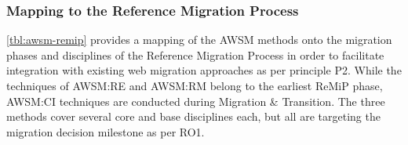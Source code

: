 \hypertarget{sec:remip-mapping}{%
\subsubsection{Mapping to the Reference Migration Process}\label{sec:remip-mapping}}

\cref{tbl:awsm-remip} provides a mapping of the AWSM methods onto the migration phases and disciplines of the Reference Migration Process \autocite{Sneed2010ReMiP} in order to facilitate integration with existing web migration approaches as per principle P2.
While the techniques of AWSM:RE and AWSM:RM belong to the earliest ReMiP phase, AWSM:CI techniques are conducted during Migration \& Transition.
The three methods cover several core and base disciplines each, but all are targeting the migration decision milestone as per RO1.

